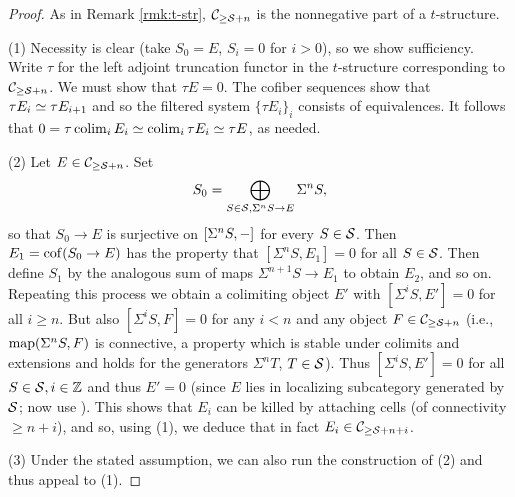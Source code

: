 \documentclass{amsart}
\numberwithin{proposition}{section}
\numberwithin{equation}{section}
\begin{document}
\begin{proof}
As in Remark \ref{rmk:t-str}, $\mathcal C_{\ge \mathcal S+n}$ is the nonnegative part of a $t$-structure.

(1)
Necessity is clear (take $S_0 = E$, $S_i = 0$ for $i>0$), so we show sufficiency.
Write $\tau$ for the left adjoint truncation functor in the $t$-structure corresponding to $\mathcal C_{\ge \mathcal S+n}$.
We must show that $\tau E = 0$.
The cofiber sequences show that $\tau E_i \simeq \tau E_{i+1}$ and so the filtered system $\{\tau E_i\}_i$ consists of equivalences.
It follows that $0 = \tau \operatorname*{colim}_i E_i \simeq \operatorname*{colim}_i \tau E_i \simeq \tau E$, as needed.

(2)
Let $E \in \mathcal C_{\ge \mathcal S + n}$.
Set \[ S_0 = \bigoplus_{S \in \mathcal S, \Sigma^n S \to E} \Sigma^n S, \] so that $S_0 \to E$ is surjective on $[\Sigma^n S, \mathord-]$ for every $S \in \mathcal S$.
Then $E_1 = \operatorname{cof}(S_0 \to E)$ has the property that $[\Sigma^n S, E_1] = 0$ for all $S \in \mathcal S$.
Then define $S_1$ by the analogous sum of maps $\Sigma^{n+1}S \to E_1$ to obtain $E_2$, and so on.
Repeating this process we obtain a colimiting object $E'$ with $[\Sigma^i S, E'] = 0$ for all $i \ge n$.
But also $[\Sigma^i S, F] = 0$ for any $i < n$ and any object $F \in \mathcal C_{\ge \mathcal S +n}$ (i.e., $\mathrm{map}(\Sigma^n S, F)$ is connective, a property which is stable under colimits and extensions and holds for the generators $\Sigma^n T$, $T \in \mathcal S$).
Thus $[\Sigma^i S, E'] = 0$ for all $S \in \mathcal S, i \in \mathbb{Z}$ and thus $E'=0$ (since $E$ lies in localizing subcategory generated by $\mathcal S$; now use \cite[Lemma~2.2.1]{schwede-shipley2003modules}).
This shows that $E_i$ can be killed by attaching cells (of connectivity $\ge n+i$), and so, using (1), we deduce that in fact $E_i \in \mathcal C_{\ge \mathcal S + n+i}$.

(3) Under the stated assumption, we can also run the construction of (2) and thus appeal to (1).
\end{proof}
\end{document}
